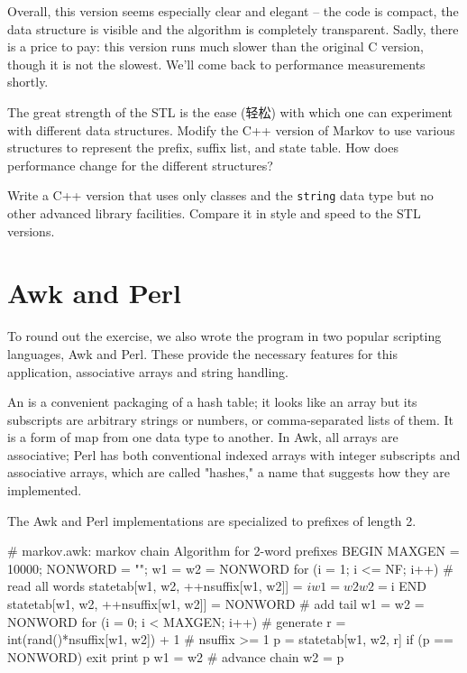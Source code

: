 Overall, this version seems especially clear and elegant -- the code is
compact, the data structure is visible and the algorithm is completely
transparent.  Sadly, there is a price to pay: this version runs much slower
than the original C version, though it is not the slowest. We'll come back
to performance measurements shortly.

\begin{exercise}
    The great strength of the STL is the ease (轻松) with which one can
    experiment with different data structures. Modify the C++ version of
    Markov to use various structures to represent the prefix, suffix list,
    and state table. How does performance change for the different
    structures?
\end{exercise}

\begin{exercise}
    Write a C++ version that uses only classes and the \verb'string' data
    type but no other advanced library facilities. Compare it in style and
    speed to the STL versions.
\end{exercise}

\section{Awk and Perl}
\label{sec:awk_and_perl}

To round out the exercise, we also wrote the program in two popular
scripting languages, Awk and Perl. These provide the necessary features for
this application, associative arrays and string handling.

An  is a convenient packaging of a hash table; it
looks like an array but its subscripts are arbitrary strings or numbers, or
comma-separated lists of them. It is a form of map from one data type to
another. In Awk, all arrays are associative; Perl has both conventional
indexed arrays with integer subscripts and associative arrays, which are
called "hashes," a name that suggests how they are implemented.

The Awk and Perl implementations are specialized to prefixes of length 2.
\begin{wellcode}
    # markov.awk: markov chain Algorithm for 2-word prefixes
    BEGIN { MAXGEN = 10000; NONWORD = "\n"; w1 = w2 = NONWORD }
    { 
        for (i = 1; i <= NF; i++) {   # read all words
            statetab[w1, w2, ++nsuffix[w1, w2]] = $i
            w1 = w2
            w2 = $i
        }
    }
    END {
        statetab[w1, w2, ++nsuffix[w1, w2]] = NONWORD # add tail
        w1 = w2 = NONWORD
        for (i = 0; i < MAXGEN; i++) { # generate
            r = int(rand()*nsuffix[w1, w2]) + 1 # nsuffix >= 1
            p = statetab[w1, w2, r]
            if (p == NONWORD)
                exit
            print p
            w1 = w2 # advance chain
            w2 = p
        }
    }
\end{wellcode}

